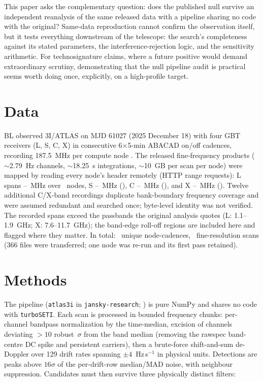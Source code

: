 \documentclass[twocolumn]{aastex631}
\newcommand{\code}[1]{\texttt{#1}}
\begin{document}
This paper asks the complementary question: does the published null survive an
independent reanalysis of the same released data with a pipeline sharing no code
with the original? Same-data reproduction cannot confirm the observation itself, but it
tests everything downstream of the telescope: the search's completeness against its
stated parameters, the interference-rejection logic, and the sensitivity arithmetic.
For technosignature claims, where a future positive would demand extraordinary
scrutiny, demonstrating that the null pipeline audit is practical seems worth doing
once, explicitly, on a high-profile target.

\section{Data}
BL observed 3I/ATLAS on MJD 61027 (2025 December 18) with four GBT receivers (L, S, C,
X) in consecutive 6$\times$5-min ABACAD on/off cadences, recording 187.5~MHz per
compute node \citep{jacobsonbell2025}. The released fine-frequency products
($\sim$2.79~Hz channels, $\sim$18.25~s integrations, $\sim$10~GB per scan per node)
were mapped by reading every node's header remotely (HTTP range requests): L spans
\aiLBandLo--\aiLBandHi~MHz over \aiLNodes\ nodes, S \aiSBandLo--\aiSBandHi~MHz
(\aiSNodes), C \aiCBandLo--\aiCBandHi~MHz (\aiCNodes), and X
\aiXBandLo--\aiXBandHi~MHz (\aiXNodes). Twelve additional C/X-band recordings duplicate
bank-boundary frequency coverage and were assumed redundant and searched once;
byte-level identity was not verified. The recorded spans exceed
the passbands the original analysis quotes (L: 1.1--1.9~GHz; X: 7.6--11.7~GHz); the
band-edge roll-off regions are included here and flagged where they matter. In total:
\aiTotNodes\ unique node-cadences, \aiTotScans\ fine-resolution scans
(366 files were transferred; one node was re-run and its first pass retained).

\section{Methods}
The pipeline (\code{atlas3i} in \code{jansky-research}; \citealt{janskyresearch}) is
pure NumPy and shares no code with \code{turboSETI}. Each scan is processed in bounded
frequency chunks: per-channel bandpass normalization by the time-median, excision of
channels deviating $>10$ robust~$\sigma$ from the band median (removing the rawspec
band-centre DC spike and persistent carriers), then a brute-force shift-and-sum
de-Doppler over 129 drift rates spanning $\pm4$~Hz\,s$^{-1}$ in physical units.
Detections are peaks above $16\sigma$ of the per-drift-row median/MAD noise, with
neighbour suppression. Candidates must then survive three physically distinct filters:
\end{document}
